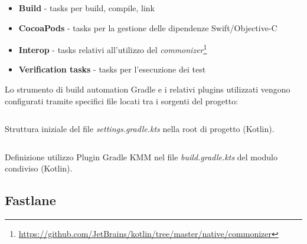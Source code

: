 \begin{itemize}
    \item \textbf{Build} - tasks per build, compile, link
    \item \textbf{CocoaPods} - tasks per la gestione delle dipendenze Swift/Objective-C
    \item \textbf{Interop} - tasks relativi all'utilizzo del \textit{commonizer}\footnote{\href{https://github.com/JetBrains/kotlin/tree/master/native/commonizer}{https://github.com/JetBrains/kotlin/tree/master/native/commonizer}}
    \item \textbf{Verification tasks} - tasks per l'esecuzione dei test
\end{itemize}

Lo strumento di build automation Gradle e i relativi plugins utilizzati vengono configurati tramite specifici file locati tra i sorgenti del progetto:

\begin{listing}[H]
\inputminted{kotlin}{code/3-gradlekmm1}
\caption{Struttura iniziale del file \textit{settings.gradle.kts} nella root di progetto (Kotlin).}
\end{listing}

\begin{listing}[H]
\inputminted{kotlin}{code/3-gradlekmm2}
\caption{Definizione utilizzo Plugin Gradle KMM nel file \textit{build.gradle.kts} del modulo condiviso (Kotlin).}
\end{listing}

\subsection{Fastlane}



